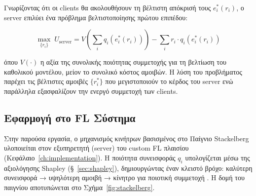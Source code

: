 Γνωρίζοντας ότι οι clients θα ακολουθήσουν τη βέλτιστη απόκρισή
τους $e_i^*(r_i)$, ο server επιλύει ένα πρόβλημα βελτιστοποίησης
πρώτου επιπέδου:

\begin{equation}
    \label{eq:server_utility}
    \max_{\{r_i\}} \; U_{\text{server}} = V\!\left(\sum_{i} q_i(e_i^*(r_i))\right)
    - \sum_{i} r_i \cdot q_i(e_i^*(r_i))
\end{equation}

\noindent όπου $V(\cdot)$ η αξία της συνολικής ποιότητας συμμετοχής
για τη βελτίωση του καθολικού μοντέλου, μείον το συνολικό κόστος
αμοιβών. Η λύση του προβλήματος παρέχει τις βέλτιστες αμοιβές
$\{r_i^*\}$ που μεγιστοποιούν το κέρδος του server ενώ παράλληλα
εξασφαλίζουν την ενεργό συμμετοχή των clients.

\subsection{Εφαρμογή στο FL Σύστημα}
\label{subsec:game_theory_fl}

Στην παρούσα εργασία, ο μηχανισμός κινήτρων βασισμένος στο Παίγνιο
Stackelberg υλοποιείται στον εξυπηρετητή (server) του custom FL πλαισίου
(Κεφάλαιο~\ref{ch:implementation}). Η ποιότητα συνεισφοράς $q_i$
υπολογίζεται μέσω της αξιολόγησης Shapley (§~\ref{sec:shapley}),
δημιουργώντας έναν κλειστό βρόχο: καλύτερη συνεισφορά → υψηλότερη
αμοιβή → κίνητρο για ποιοτική συμμετοχή \cite{Pavlidis2021,Yu2020}.
Η δομή του παιγνίου αποτυπώνεται στο Σχήμα~\ref{fig:stackelberg}.

